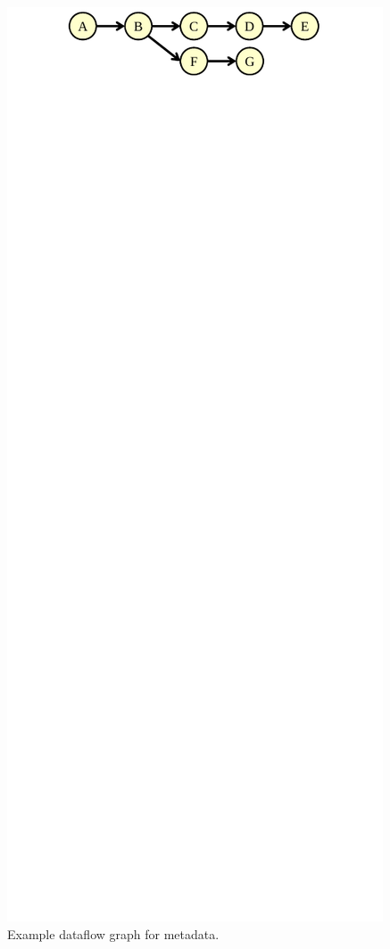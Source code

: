 \begin{figure}
  \begin{center}
    \includegraphics[width=\columnwidth]{figs/dataflow_graph.pdf}
    \vspace{-0.3in}
    \caption{Example dataflow graph for metadata.}
    \label{fig:drop.dataflow_graph}
    \vspace{-0.1in}
  \end{center}
\end{figure}

